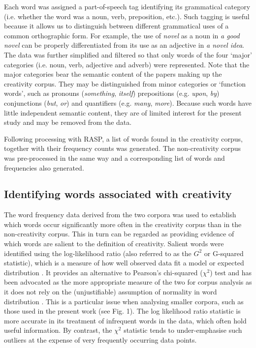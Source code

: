 \documentclass[10pt,letterpaper]{article}
\begin{document}
Each word was assigned a part-of-speech tag identifying its grammatical category (i.e. whether the word was a noun, verb, preposition, etc.). Such tagging is useful because it allows us to distinguish between different grammatical uses of a common orthographic form. For example, the use of {\em novel\/} as a noun in {\em a good novel\/} can be properly differentiated from its use as an adjective in {\em a novel idea\/}.  The data was further simplified and filtered so that only words of the four `major' categories (i.e. noun, verb, adjective and adverb) were represented. Note that the major categories bear the semantic content of the papers making up the creativity corpus. They may be distinguished from minor categories or `function words', such as pronouns ({\em something\/}, {\em itself\/}) prepositions (e.g. {\em upon\/}, {\em by\/}) conjunctions ({\em but\/}, {\em or\/}) and quantifiers (e.g. {\em many\/}, {\em more\/}). Because such words have little independent semantic content, they are of limited interest for the present study and may be removed from the data.  

Following processing with RASP, a list of words found in the creativity corpus, together with their frequency counts was generated. The non-creativity corpus was pre-processed in the same way and a corresponding list of words and frequencies also generated. 


\subsection*{Identifying words associated with creativity}

The word frequency data derived from the two corpora was used to establish which words occur significantly more often in the creativity corpus than in the non-creativity corpus. This in turn can be regarded as providing evidence of which words are salient to the definition of creativity. Salient words were identified using the log-likelihood ratio  (also referred to as the $G^2$ or G-squared statistic), which is a measure of how well observed data fit a model or expected distribution \cite{dunning93,kilgarriff01,rayson00,oakes98}. It provides an alternative to Pearson's chi-squared ($\chi^2$) test and has been advocated as the more appropriate measure of the two for corpus analysis as it does not rely on the (unjustifiable) assumption of normality in word distribution  \cite{dunning93,kilgarriff01,oakes98}. This is a particular issue when analysing smaller corpora, such as those used in the present work (see Fig. 1). %
The log likelihood ratio statistic is more accurate in its treatment of infrequent words in the data,  which often hold useful information. By contrast, the $\chi^2$ statistic tends to under-emphasise such outliers at the expense of very frequently occurring data points.
\end{document}
